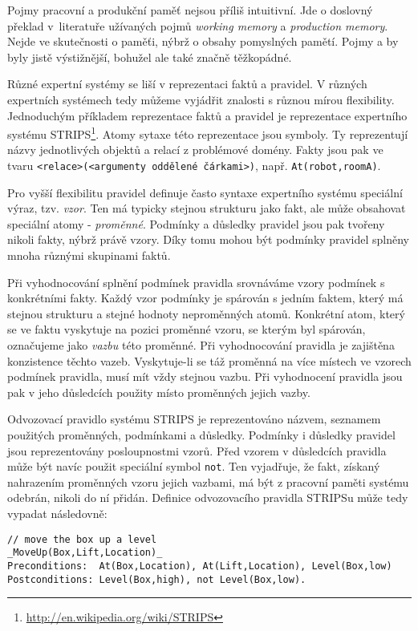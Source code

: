 Pojmy pracovní a produkční paměť nejsou příliš intuitivní. Jde o doslovný
překlad v~literatuře užívaných pojmů \emph{working memory} a \emph{production
memory}. Nejde ve skutečnosti o paměťi, nýbrž o obsahy pomyslných pamětí. Pojmy
 a  by byly jistě
výstižnější, bohužel ale také značně těžkopádné.

Různé expertní systémy se liší v reprezentaci faktů a pravidel. V různých
expertních systémech tedy můžeme vyjádřit znalosti s různou mírou flexibility.
Jednoduchým příkladem reprezentace faktů a pravidel je reprezentace expertního
systému STRIPS\footnote{\url{http://en.wikipedia.org/wiki/STRIPS}}. Atomy sytaxe
této reprezentace jsou symboly. Ty reprezentují názvy jednotlivých objektů a
relací z problémové domény. Fakty jsou pak ve tvaru
\verb|<relace>(<argumenty oddělené čárkami>)|, např. \verb|At(robot,roomA)|.

Pro vyšší flexibilitu pravidel definuje často syntaxe expertního systému
speciální výraz, tzv. \emph{vzor}. Ten má typicky stejnou strukturu jako fakt,
ale může obsahovat speciální atomy - \emph{proměnné}. Podmínky a důsledky
pravidel jsou pak tvořeny nikoli fakty, nýbrž právě vzory. Díky tomu mohou být
podmínky pravidel splněny mnoha různými skupinami faktů.

Při vyhodnocování splnění podmínek pravidla srovnáváme vzory podmínek s
konkrétními fakty. Každý vzor podmínky je spárován s jedním faktem, který má
stejnou strukturu a stejné hodnoty neproměnných atomů. Konkrétní atom, který se
ve faktu vyskytuje na pozici proměnné vzoru, se kterým byl spárován, označujeme
jako \emph{vazbu} této proměnné. Při vyhodnocování pravidla je zajištěna
konzistence těchto vazeb. Vyskytuje-li se táž proměnná na více místech ve
vzorech podmínek pravidla, musí mít vždy stejnou vazbu. Při vyhodnocení pravidla
jsou pak v jeho důsledcích použity místo proměnných jejich vazby.

Odvozovací pravidlo systému STRIPS je reprezentováno názvem, seznamem použitých
proměnných, podmínkami a důsledky. Podmínky i důsledky pravidel jsou
reprezentovány posloupnostmi vzorů. Před vzorem v důsledcích pravidla může
být navíc použit speciální symbol \verb|not|. Ten vyjadřuje, že fakt, získaný
nahrazením proměnných vzoru jejich vazbami, má být z pracovní paměti systému
odebrán, nikoli do ní přidán.  Definice odvozovacího pravidla STRIPSu může tedy
vypadat následovně:
\begin{verbatim}
// move the box up a level
_MoveUp(Box,Lift,Location)_
Preconditions:  At(Box,Location), At(Lift,Location), Level(Box,low)
Postconditions: Level(Box,high), not Level(Box,low).
\end{verbatim}

